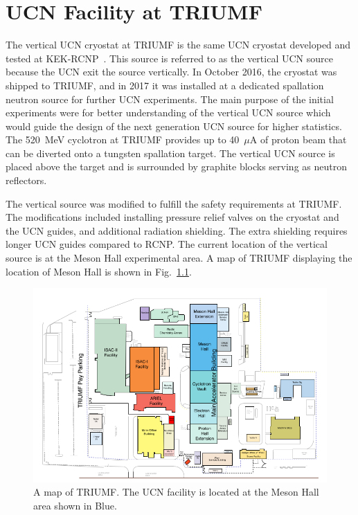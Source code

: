 \chapter{UCN Facility at TRIUMF\label{chap:UCNattriumf}}


The vertical UCN cryostat at TRIUMF is the same UCN cryostat developed
and tested at
KEK-RCNP~\cite{masuda2002spallation,masuda2012spallation}. This source
is referred to as the vertical UCN source because the UCN exit the
source vertically.  In October 2016, the cryostat was shipped to
TRIUMF, and in 2017 it was installed at a dedicated spallation neutron
source for further UCN experiments. The main purpose of the initial
experiments were for better understanding of the vertical UCN source
which would guide the design of the next generation UCN source for
higher statistics. The 520~MeV cyclotron at TRIUMF provides up to
40~$\mu$A of proton beam that can be diverted onto a tungsten
spallation target. The vertical UCN source is placed above the target
and is surrounded by graphite blocks serving as neutron reflectors.


The vertical source was modified to fulfill the safety requirements at
TRIUMF. The modifications included installing pressure relief valves
on the cryostat and the UCN guides, and additional radiation
shielding. The extra shielding requires longer UCN guides compared to
RCNP. The current location of the vertical source is at the Meson Hall
experimental area. A map of TRIUMF displaying the location of Meson
Hall is shown in Fig.~\ref{fig:sitemap}.

\begin{figure}[h!]
  \centering
  \includegraphics[width=1.0\textwidth]{sitemap.png}
  \caption[A map of TRIUMF]{A map of TRIUMF. The UCN facility is
    located at the Meson Hall area shown in Blue.}
  \label{fig:sitemap}
\end{figure}

